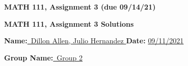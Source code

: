 \documentclass[11pt]{amsart}
\begin{document}
\begin{center}
\textbf{MATH 111, Assignment 3 (due 09/14/21)}%
\end{center}

\vspace{.1in}

\begin{center}
\textbf{MATH 111, Assignment 3 Solutions}%
\end{center}

\vspace{.1 in}

\textbf{Name:}\underline{\ Dillon Allen, Julio Hernandez } \hspace{1in} \textbf{Date:} \underline{ 09/11/2021}%

\textbf{Group Name:}\underline{\ Group 2}


\begin{center}
\begin{tabular}{|p{2.5in}|}
\hline

\hline
\end{tabular}
\end{center}

\vspace{.2in}
\end{document}
